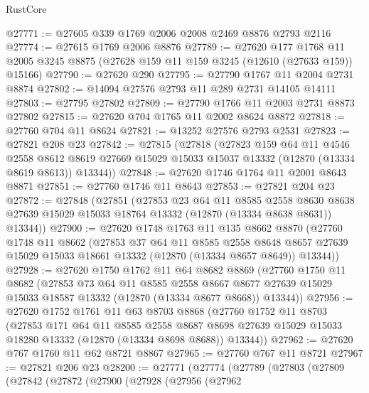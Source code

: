 \begin{lexlean}{RustCore}
\begin{coremodule}
@27771 := @27605 @339 @1769 @2006 @2008 @2469 @8876 @2793 @2116
@27774 := @27615 @1769 @2006 @8876
@27789 := @27620
    @177
    @1768
    @11
    @2005
    @3245
    @8875
    (@27628 @159 @11 @159 @3245 (@12610 (@27633 @159)) @15166)
@27790 := @27620 @290
@27795 := @27790 @1767 @11 @2004 @2731 @8874
@27802 := @14094 @27576 @2793 @11 @289 @2731 @14105 @14111
@27803 := @27795 @27802
@27809 := @27790 @1766 @11 @2003 @2731 @8873 @27802
@27815 := @27620 @704 @1765 @11 @2002 @8624 @8872
@27818 := @27760 @704 @11 @8624
@27821 := @13252 @27576 @2793 @2531
@27823 := @27821 @208 @23
@27842 := @27815
    (@27818
      (@27823
        @159
        @64
        @11
        @4546
        @2558
        @8612
        @8619
        @27669
        @15029
        @15033
        @15037
        @13332
        (@12870 (@13334 @8619 @8613))
        @13344))
@27848 := @27620 @1746 @1764 @11 @2001 @8643 @8871
@27851 := @27760 @1746 @11 @8643
@27853 := @27821 @204 @23
@27872 := @27848
    (@27851
      (@27853
        @23
        @64
        @11
        @8585
        @2558
        @8630
        @8638
        @27639
        @15029
        @15033
        @18764
        @13332
        (@12870 (@13334 @8638 @8631))
        @13344))
@27900 := @27620
    @1748
    @1763
    @11
    @135
    @8662
    @8870
    (@27760
      @1748
      @11
      @8662
      (@27853
        @37
        @64
        @11
        @8585
        @2558
        @8648
        @8657
        @27639
        @15029
        @15033
        @18661
        @13332
        (@12870 (@13334 @8657 @8649))
        @13344))
@27928 := @27620
    @1750
    @1762
    @11
    @64
    @8682
    @8869
    (@27760
      @1750
      @11
      @8682
      (@27853
        @73
        @64
        @11
        @8585
        @2558
        @8667
        @8677
        @27639
        @15029
        @15033
        @18587
        @13332
        (@12870 (@13334 @8677 @8668))
        @13344))
@27956 := @27620
    @1752
    @1761
    @11
    @63
    @8703
    @8868
    (@27760
      @1752
      @11
      @8703
      (@27853
        @171
        @64
        @11
        @8585
        @2558
        @8687
        @8698
        @27639
        @15029
        @15033
        @18280
        @13332
        (@12870 (@13334 @8698 @8688))
        @13344))
@27962 := @27620 @767 @1760 @11 @62 @8721 @8867
@27965 := @27760 @767 @11 @8721
@27967 := @27821 @206 @23
@28200 := @27771
    (@27774
      (@27789
        (@27803
          (@27809
            (@27842
              (@27872
                (@27900
                  (@27928
                    (@27956
                      (@27962

\end{coremodule}
\end{lexlean}
